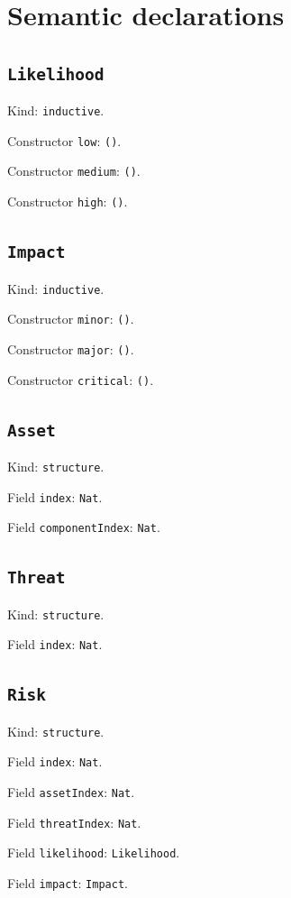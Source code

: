 \documentclass[11pt]{article}
\begin{document}
\section*{Semantic declarations}
\subsection*{\texttt{Likelihood}}
\noindent Kind: \texttt{inductive}.\par
\noindent Constructor \texttt{low}: \texttt{()}.\par
\noindent Constructor \texttt{medium}: \texttt{()}.\par
\noindent Constructor \texttt{high}: \texttt{()}.\par
\subsection*{\texttt{Impact}}
\noindent Kind: \texttt{inductive}.\par
\noindent Constructor \texttt{minor}: \texttt{()}.\par
\noindent Constructor \texttt{major}: \texttt{()}.\par
\noindent Constructor \texttt{critical}: \texttt{()}.\par
\subsection*{\texttt{Asset}}
\noindent Kind: \texttt{structure}.\par
\noindent Field \texttt{index}: \texttt{Nat}.\par
\noindent Field \texttt{componentIndex}: \texttt{Nat}.\par
\subsection*{\texttt{Threat}}
\noindent Kind: \texttt{structure}.\par
\noindent Field \texttt{index}: \texttt{Nat}.\par
\subsection*{\texttt{Risk}}
\noindent Kind: \texttt{structure}.\par
\noindent Field \texttt{index}: \texttt{Nat}.\par
\noindent Field \texttt{assetIndex}: \texttt{Nat}.\par
\noindent Field \texttt{threatIndex}: \texttt{Nat}.\par
\noindent Field \texttt{likelihood}: \texttt{Likelihood}.\par
\noindent Field \texttt{impact}: \texttt{Impact}.\par
\end{document}
